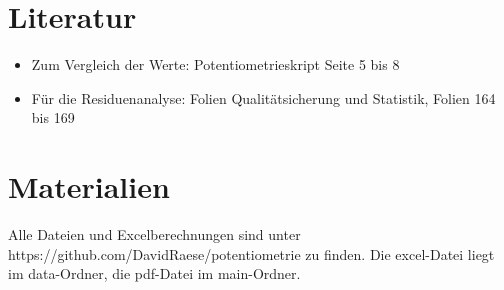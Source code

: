 \section{Literatur}
\begin{itemize}
    \item Zum Vergleich der Werte: Potentiometrieskript Seite 5 bis 8
    \item Für die Residuenanalyse: Folien Qualitätsicherung und Statistik, Folien 164 bis 169
\end{itemize}

\section{Materialien}

Alle Dateien und Excelberechnungen sind unter https://github.com/DavidRaese/potentiometrie zu finden.
Die excel-Datei liegt im data-Ordner, die pdf-Datei im main-Ordner.